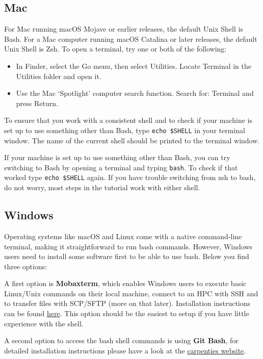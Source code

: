\documentclass[
  letterpaper,
  DIV=11,
  numbers=noendperiod]{scrreprt}
\providecommand{\tightlist}{%
  \setlength{\itemsep}{0pt}\setlength{\parskip}{0pt}}\usepackage{longtable,booktabs,array}
\begin{document}
\subsection{Mac}\label{mac}

For Mac running macOS Mojave or earlier releases, the default Unix Shell
is Bash. For a Mac computer running macOS Catalina or later releases,
the default Unix Shell is Zsh. To open a terminal, try one or both of
the following:

\begin{itemize}
\tightlist
\item
  In Finder, select the Go menu, then select Utilities. Locate Terminal
  in the Utilities folder and open it.
\item
  Use the Mac `Spotlight' computer search function. Search for: Terminal
  and press Return.
\end{itemize}

To ensure that you work with a consistent shell and to check if your
machine is set up to use something other than Bash, type
\texttt{echo\ \$SHELL} in your terminal window. The name of the current
shell should be printed to the terminal window.

If your machine is set up to use something other than Bash, you can try
switching to Bash by opening a terminal and typing \texttt{bash}. To
check if that worked type \texttt{echo\ \$SHELL} again. If you have
trouble switching from zsh to bash, do not worry, most steps in the
tutorial work with either shell.

\subsection{Windows}\label{windows}

Operating systems like macOS and Linux come with a native command-line
terminal, making it straightforward to run bash commands. However,
Windows users need to install some software first to be able to use
bash. Below you find three options:

A first option is \textbf{Mobaxterm}, which enables Windows users to
execute basic Linux/Unix commands on their local machine, connect to an
HPC with SSH and to transfer files with SCP/SFTP (more on that later).
Installation instructions can be found
\href{https://hpc.ncsu.edu/Documents/mobaxterm.php}{here}. This option
should be the easiest to setup if you have little experience with the
shell.

A second option to access the bash shell commands is using \textbf{Git
Bash}, for detailed installation instructions please have a look at the
\href{https://carpentries.github.io/workshop-template/install_instructions/\#shell-windows}{carpenties
website}.
\end{document}
